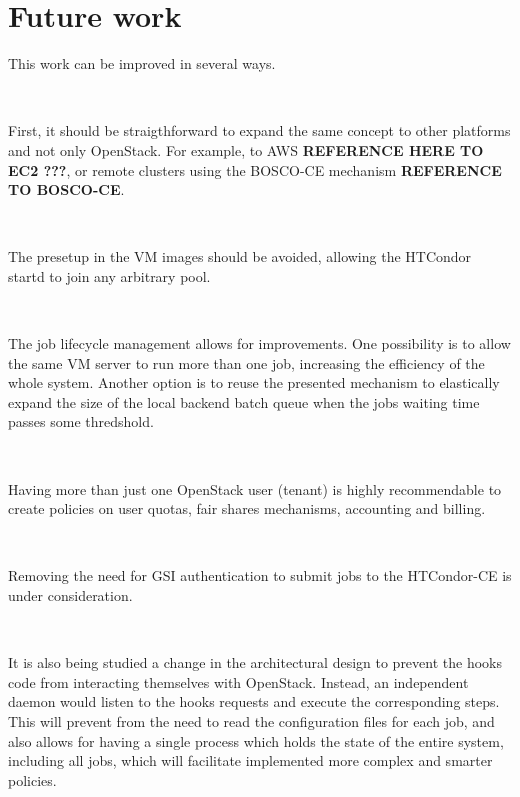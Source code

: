 \documentclass[a4paper]{jpconf}
\begin{document}
\section{Future work}

This work can be improved in several ways. 

~

First, it should be straigthforward to expand the same concept to other platforms and not only OpenStack. 
For example, to AWS \textbf{REFERENCE HERE TO EC2 ???}, or remote clusters using the BOSCO-CE mechanism \textbf{REFERENCE TO BOSCO-CE}.

~

The presetup in the VM images should be avoided, allowing the HTCondor startd to join any arbitrary pool.

~

The job lifecycle management allows for improvements. 
One possibility is to allow the same VM server to run more than one job, increasing the efficiency of the whole system.
Another option is to reuse the presented mechanism to elastically expand the size of the local backend batch queue when the jobs waiting time passes some thredshold. 

~

Having more than just one OpenStack user (tenant) is highly recommendable to create policies on user quotas, fair shares mechanisms, accounting and billing. 

~

Removing the need for GSI authentication to submit jobs to the HTCondor-CE is under consideration.

~

It is also being studied a change in the architectural design to prevent the hooks code from interacting themselves with OpenStack.
Instead, an independent daemon would listen to the hooks requests and execute the corresponding steps. 
This will prevent from the need to read the configuration files for each job, 
and also allows for having a single process which holds the state of the entire system, including all jobs, 
which will facilitate implemented more complex and smarter policies. 
 


\end{document}
